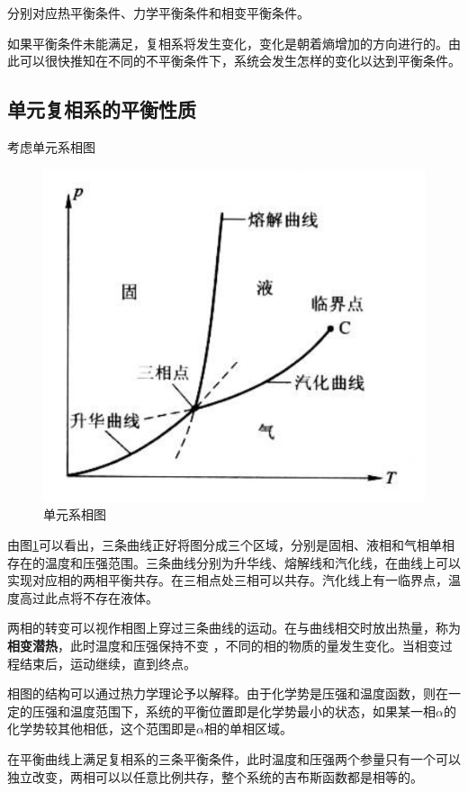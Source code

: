 \documentclass[UTF8]{ctexart}
\begin{document}
\noindent 分别对应热平衡条件、力学平衡条件和相变平衡条件。

	如果平衡条件未能满足，复相系将发生变化，变化是朝着熵增加的方向进行的。由此可以很快推知在不同的不平衡条件下，系统会发生怎样的变化以达到平衡条件。
	
	\subsection{单元复相系的平衡性质}
	考虑单元系相图
	\begin{figure}[ht]
		\centering
		\includegraphics[width=12cm]{Ther_equilibrium.png}
		\caption{单元系相图}
		\label{figure_2}
	\end{figure}

\noindent 由图\ref{figure_2}可以看出，三条曲线正好将图分成三个区域，分别是固相、液相和气相单相存在的温度和压强范围。三条曲线分别为升华线、熔解线和汽化线，在曲线上可以实现对应相的两相平衡共存。在三相点处三相可以共存。汽化线上有一临界点，温度高过此点将不存在液体。

	两相的转变可以视作相图上穿过三条曲线的运动。在与曲线相交时放出热量，称为\textbf{相变潜热}，此时温度和压强保持不变 ，不同的相的物质的量发生变化。当相变过程结束后，运动继续，直到终点。
	
	相图的结构可以通过热力学理论予以解释。由于化学势是压强和温度函数，则在一定的压强和温度范围下，系统的平衡位置即是化学势最小的状态，如果某一相$ \alpha $的化学势较其他相低，这个范围即是$ \alpha $相的单相区域。
	
	在平衡曲线上满足复相系的三条平衡条件，此时温度和压强两个参量只有一个可以独立改变，两相可以以任意比例共存，整个系统的吉布斯函数都是相等的。
	
\end{document}
